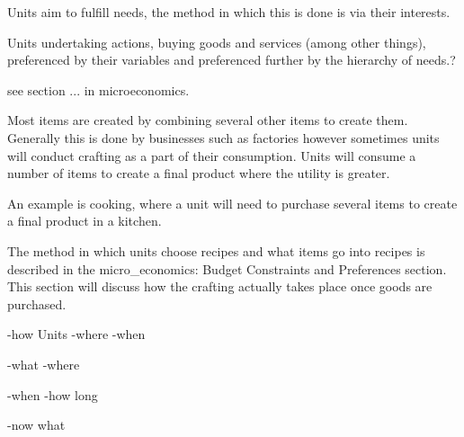
Units aim to fulfill needs, the method in which this is done is via their interests.

Units undertaking actions, buying goods and services (among other things), preferenced by their variables and preferenced further by the hierarchy of needs.?

see section ... in microeconomics.


Most items are created by combining several other items to create them. Generally this is done by businesses such as factories however sometimes units will conduct crafting as a part of their consumption. Units will consume a number of items to create a final product where the utility is greater. 

An example is cooking, where a unit will need to purchase several items to create a final product in a kitchen.

The method in which units choose recipes and what items go into recipes is described in the micro_economics: Budget Constraints and Preferences section. This section will discuss how the crafting actually takes place once goods are purchased.



  -how
Units  
  -where
  -when

  -what
  -where

  -when
  -how long

  -now what 


